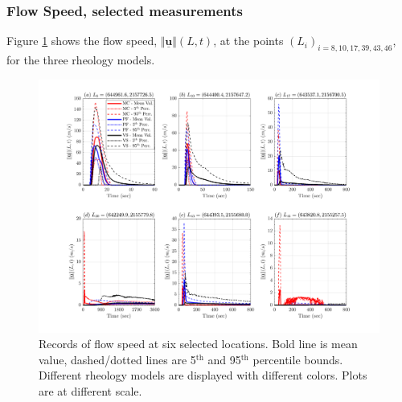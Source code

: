 \documentclass{article}
\begin{document}
\subsubsection{Flow Speed, selected measurements}
Figure \ref{fig:Colima-Vel} shows the flow speed, $\Vert \underline{\mathbf{u}} \Vert(L,t)$, at the points $(L_i)_{i=8,10,17,39,43,46}$, for the three rheology models.
\begin{figure}[H]
         \centering
        \includegraphics[width=1\textwidth]{BAF_VolcanDeColima/LocalMeasurments/Velocity_Col.png}
        \caption{Records of flow speed at six selected locations. Bold line is mean value, dashed/dotted lines are 5$^{\mathrm{th}}$ and 95$^{\mathrm{th}}$ percentile bounds. Different rheology models are displayed with different colors. Plots are at different scale.}
        \label{fig:Colima-Vel}
\end{figure}
\end{document}
